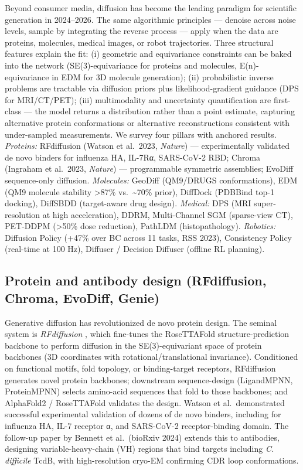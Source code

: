 \documentclass{article}
\begin{document}
Beyond consumer media, diffusion has become the leading paradigm for scientific generation in 2024--2026. The same algorithmic principles --- denoise across noise levels, sample by integrating the reverse process --- apply when the data are proteins, molecules, medical images, or robot trajectories. Three structural features explain the fit: (i) geometric and equivariance constraints can be baked into the network (SE(3)-equivariance for proteins and molecules, E(n)-equivariance in EDM for 3D molecule generation); (ii) probabilistic inverse problems are tractable via diffusion priors plus likelihood-gradient guidance (DPS for MRI/CT/PET); (iii) multimodality and uncertainty quantification are first-class --- the model returns a distribution rather than a point estimate, capturing alternative protein conformations or alternative reconstructions consistent with under-sampled measurements. We survey four pillars with anchored results. \emph{Proteins:} RFdiffusion (Watson et al.~2023, \emph{Nature}) --- experimentally validated de novo binders for influenza HA, IL-7Rα, SARS-CoV-2 RBD; Chroma (Ingraham et al.~2023, \emph{Nature}) --- programmable symmetric assemblies; EvoDiff sequence-only diffusion. \emph{Molecules:} GeoDiff (QM9/DRUGS conformations), EDM (QM9 molecule stability \textgreater87\% vs.~\textasciitilde70\% prior), DiffDock (PDBBind top-1 docking), DiffSBDD (target-aware drug design). \emph{Medical:} DPS (MRI super-resolution at high acceleration), DDRM, Multi-Channel SGM (sparse-view CT), PET-DDPM (\textgreater50\% dose reduction), PathLDM (histopathology). \emph{Robotics:} Diffusion Policy (+47\% over BC across 11 tasks, RSS 2023), Consistency Policy (real-time at 100 Hz), Diffuser / Decision Diffuser (offline RL planning).

\subsection{Protein and antibody design (RFdiffusion, Chroma, EvoDiff, Genie)}\label{protein-and-antibody-design-rfdiffusion-chroma-evodiff-genie}

Generative diffusion has revolutionized de novo protein design. The seminal system is \emph{RFdiffusion} \citep{watson20232023}, which fine-tunes the RoseTTAFold structure-prediction backbone to perform diffusion in the SE(3)-equivariant space of protein backbones (3D coordinates with rotational/translational invariance). Conditioned on functional motifs, fold topology, or binding-target receptors, RFdiffusion generates novel protein backbones; downstream sequence-design (LigandMPNN, ProteinMPNN) selects amino-acid sequences that fold to those backbones; and AlphaFold2 / RoseTTAFold validates the design. Watson et al.~demonstrated successful experimental validation of dozens of de novo binders, including for influenza HA, IL-7 receptor α, and SARS-CoV-2 receptor-binding domain. The follow-up paper by Bennett et al.~(bioRxiv 2024) extends this to antibodies, designing variable-heavy-chain (VH) regions that bind targets including \emph{C. difficile} TcdB, with high-resolution cryo-EM confirming CDR loop conformations.
\end{document}
